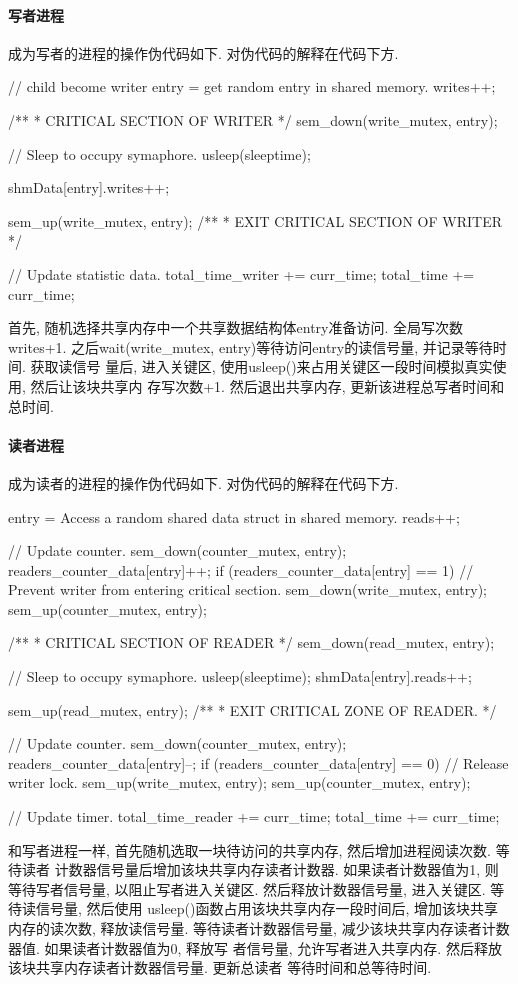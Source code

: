 \paragraph{写者进程}
成为写者的进程的操作伪代码如下. 对伪代码的解释在代码下方.
\begin{code}
    // child become writer
    entry = get random entry in shared memory.
writes++;

    /**
    * CRITICAL SECTION OF WRITER
    */
sem_down(write_mutex, entry);

// Sleep to occupy symaphore.
usleep(sleeptime);

shmData[entry].writes++;

sem_up(write_mutex, entry);
/**
* EXIT CRITICAL SECTION OF WRITER
*/

// Update statistic data.
total_time_writer += curr_time;
total_time += curr_time;

\end{code}

首先, 随机选择共享内存中一个共享数据结构体entry准备访问. 全局写次数writes+1.
之后wait(write\_mutex, entry)等待访问entry的读信号量, 并记录等待时间. 获取读信号
量后, 进入关键区, 使用usleep()来占用关键区一段时间模拟真实使用, 然后让该块共享内
存写次数+1. 然后退出共享内存, 更新该进程总写者时间和总时间.

\paragraph{读者进程}
成为读者的进程的操作伪代码如下. 对伪代码的解释在代码下方.
\begin{code}
entry =  Access a random shared data struct in shared memory.
reads++;

// Update counter.
sem_down(counter_mutex, entry);
readers_counter_data[entry]++;
if (readers_counter_data[entry] == 1) {
        // Prevent writer from entering critical section.
        sem_down(write_mutex, entry);
    }
sem_up(counter_mutex, entry);

/**
* CRITICAL SECTION OF READER
*/
sem_down(read_mutex, entry);

    // Sleep to occupy symaphore.
usleep(sleeptime);
shmData[entry].reads++;

sem_up(read_mutex, entry);
/**
* EXIT CRITICAL ZONE OF READER.
*/

// Update counter.
sem_down(counter_mutex, entry);
readers_counter_data[entry]--;
if (readers_counter_data[entry] == 0) {
        // Release writer lock.
        sem_up(write_mutex, entry);
    }
sem_up(counter_mutex, entry);

// Update timer.
total_time_reader += curr_time;
total_time += curr_time;
\end{code}
和写者进程一样, 首先随机选取一块待访问的共享内存, 然后增加进程阅读次数. 等待读者
计数器信号量后增加该块共享内存读者计数器. 如果读者计数器值为1, 则等待写者信号量,
以阻止写者进入关键区. 然后释放计数器信号量, 进入关键区. 等待读信号量, 然后使用
usleep()函数占用该块共享内存一段时间后, 增加该块共享内存的读次数, 释放读信号量.
等待读者计数器信号量, 减少该块共享内存读者计数器值. 如果读者计数器值为0, 释放写
者信号量, 允许写者进入共享内存. 然后释放该块共享内存读者计数器信号量. 更新总读者
等待时间和总等待时间.


